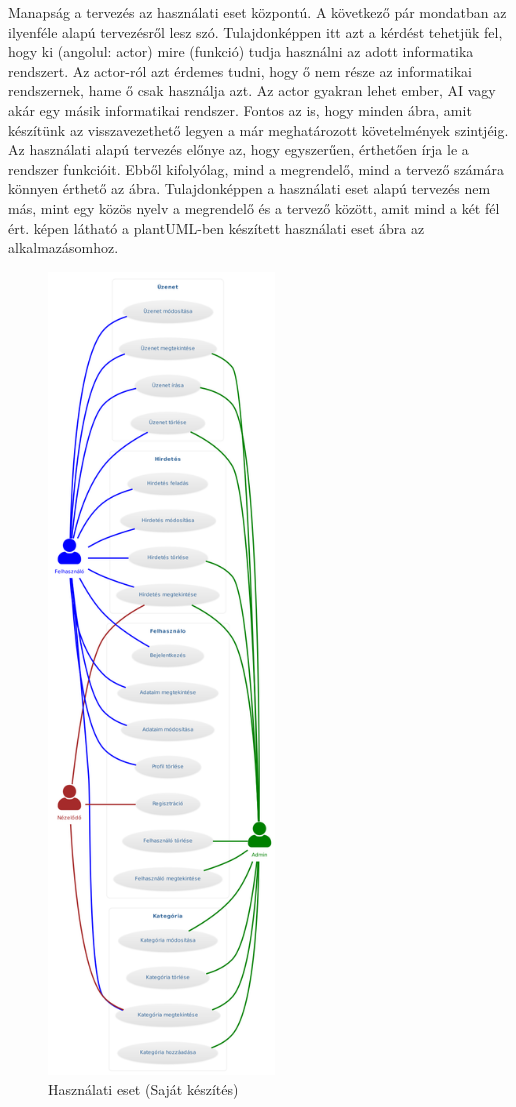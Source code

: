 \documentclass[]{thesis-ekf}
\theoremstyle{definition}
\theoremstyle{remark}
\begin{document}
	Manapság a tervezés az használati eset központú. A következő pár mondatban az ilyenféle alapú tervezésről lesz szó. Tulajdonképpen itt azt a kérdést tehetjük fel, hogy ki (angolul: actor) mire (funkció) tudja használni az adott informatika rendszert. Az actor-ról azt érdemes tudni, hogy ő nem része az informatikai rendszernek, hame ő csak használja azt. Az actor gyakran lehet ember, AI vagy akár egy másik informatikai rendszer. Fontos az is, hogy minden ábra, amit készítünk az visszavezethető legyen a már meghatározott követelmények szintjéig. Az használati alapú tervezés előnye az, hogy egyszerűen, érthetően írja le a rendszer funkcióit. Ebből kifolyólag, mind a megrendelő, mind a tervező számára könnyen érthető az ábra. Tulajdonképpen a használati eset alapú tervezés nem más, mint egy közös nyelv a megrendelő és a tervező között, amit mind a két fél ért.\cite{Kusper Informatikai}  képen látható a plantUML-ben készített használati eset ábra az alkalmazásomhoz.
	\begin{figure}[ht!]
		\centering
		\includegraphics[width=6cm]{./tervezes/useCase}
		\caption{Használati eset (Saját készítés)} 
		\label{useCase}
	\end{figure}
\end{document}
